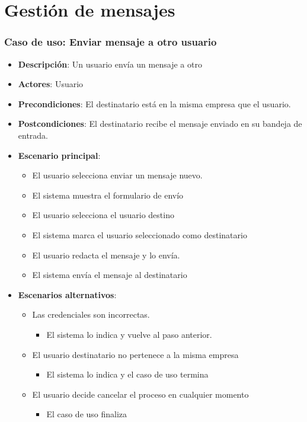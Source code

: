 \documentclass[12pt,a4paperpaper,]{report}
\providecommand{\tightlist}{%
  \setlength{\itemsep}{0pt}\setlength{\parskip}{0pt}}
\begin{document}
\section{Gestión de mensajes}\label{gestiuxf3n-de-mensajes}

\subsubsection{Caso de uso: Enviar mensaje a otro
usuario}\label{caso-de-uso-enviar-mensaje-a-otro-usuario}

\begin{itemize}
\tightlist
\item
  \textbf{Descripción}: Un usuario envía un mensaje a otro
\item
  \textbf{Actores}: Usuario
\item
  \textbf{Precondiciones}: El destinatario está en la misma empresa que
  el usuario.
\item
  \textbf{Postcondiciones}: El destinatario recibe el mensaje enviado en
  su bandeja de entrada.
\item
  \textbf{Escenario principal}:

  \begin{itemize}
  \tightlist
  \item
    El usuario selecciona enviar un mensaje nuevo.
  \item
    El sistema muestra el formulario de envío
  \item
    El usuario selecciona el usuario destino
  \item
    El sistema marca el usuario seleccionado como destinatario
  \item
    El usuario redacta el mensaje y lo envía.
  \item
    El sistema envía el mensaje al destinatario
  \end{itemize}
\item
  \textbf{Escenarios alternativos}:

  \begin{itemize}
  \tightlist
  \item
    Las credenciales son incorrectas.

    \begin{itemize}
    \tightlist
    \item
      El sistema lo indica y vuelve al paso anterior.
    \end{itemize}
  \item
    El usuario destinatario no pertenece a la misma empresa

    \begin{itemize}
    \tightlist
    \item
      El sistema lo indica y el caso de uso termina
    \end{itemize}
  \item
    El usuario decide cancelar el proceso en cualquier momento

    \begin{itemize}
    \tightlist
    \item
      El caso de uso finaliza
    \end{itemize}
  \end{itemize}
\end{itemize}
\end{document}
